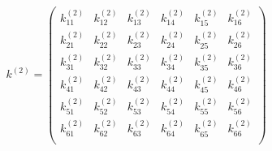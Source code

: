 \begin{equation} \label{eq: k_2}
k^{\left(2\right)} = \begin{pmatrix}
k_{11}^{\left(2\right)} & k_{12}^{\left(2\right)} &  k_{13}^{\left(2\right)} &  k_{14}^{\left(2\right)} & k_{15}^{\left(2\right)}  & k_{16}^{\left(2\right)}   \\[0.3em]
k_{21}^{\left(2\right)} & k_{22}^{\left(2\right)} &  k_{23}^{\left(2\right)} &  k_{24}^{\left(2\right)} & k_{25}^{\left(2\right)}  & k_{26}^{\left(2\right)}   \\[0.3em]
k_{31}^{\left(2\right)} & k_{32}^{\left(2\right)} &  k_{33}^{\left(2\right)} &  k_{34}^{\left(2\right)} & k_{35}^{\left(2\right)}  & k_{36}^{\left(2\right)}   \\[0.3em]
k_{41}^{\left(2\right)} & k_{42}^{\left(2\right)} &  k_{43}^{\left(2\right)} &  k_{44}^{\left(2\right)} & k_{45}^{\left(2\right)}  & k_{46}^{\left(2\right)}   \\[0.3em]
k_{51}^{\left(2\right)} & k_{52}^{\left(2\right)} &  k_{53}^{\left(2\right)} &  k_{54}^{\left(2\right)} & k_{55}^{\left(2\right)}  & k_{56}^{\left(2\right)}   \\[0.3em]
k_{61}^{\left(2\right)} & k_{62}^{\left(2\right)} &  k_{63}^{\left(2\right)} &  k_{64}^{\left(2\right)} & k_{65}^{\left(2\right)}  & k_{66}^{\left(2\right)}   \\[0.3em]
\end{pmatrix} 
\end{equation}	

\clearpage

